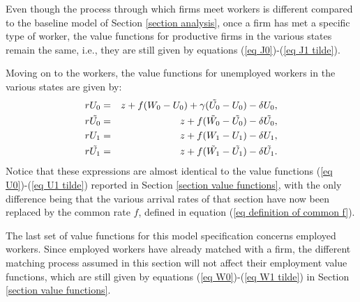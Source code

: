 \documentclass[12pt]{article} %
\theoremstyle{definition}
\begin{document}
Even though the process through which firms meet workers is different compared to the baseline model of Section \ref{section analysis}, once a firm has met a specific type of worker, the value functions for productive firms in the various states remain the same, i.e., they are still given by equations (\ref{eq J0})-(\ref{eq J1 tilde}). 

Moving on to the workers, the value functions for unemployed workers in the various states are given by: 
\begin{eqnarray}
    rU_0 &=& z+f(W_0-U_0)+\gamma(\Tilde{U_0}-U_0) - \delta U_0, \label{eq U0 inter 1}  \\
    r\Tilde{U_0} &=& z+{f}(\Tilde{W_0}-\Tilde{U_0})- \delta \Tilde{U_0}, \label{eq U0 tilde inter 1}\\
    rU_1 &=& z+f(W_1-U_1)- \delta U_1, \label{eq U1 inter 1}\\
    r\Tilde{U_1} &=& z+{f}(\Tilde{W_1}-\Tilde{U_1})- \delta \Tilde{U_1}.\label{eq U1 tilde inter 1}
\end{eqnarray}Notice that these expressions are almost identical to the value functions (\ref{eq U0})-(\ref{eq U1 tilde}) reported in Section \ref{section value functions}, with the only difference being that the various arrival rates of that section have now been replaced by the common rate $f$, defined in equation (\ref{eq definition of common f}). 

The last set of value functions for this model specification concerns employed workers. Since employed workers have already matched with a firm, the different matching process assumed in this section will not affect their employment value functions, which are still given by equations (\ref{eq W0})-(\ref{eq W1 tilde}) in Section \ref{section value functions}. 
\end{document}
